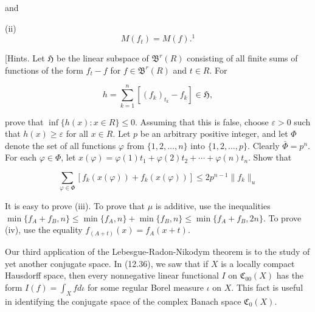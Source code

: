 and

(ii) $$M(f_t) = M(f).^1$$

[Hints. Let $\mathfrak{H}$ be the linear subspace of $\mathfrak{B}^r(R)$ consisting of all finite sums of functions of the form $f_t - f$ for $f \in \mathfrak{B}^r(R)$ and $t \in R$. For

$$h = \sum_{k=1}^{n} \left[ (f_k)_{t_k} - f_k \right] \in \mathfrak{H},$$

prove that $\inf\{h(x): x \in R\} \leq 0$. Assuming that this is false, choose $\varepsilon > 0$ such that $h(x) \geq \varepsilon$ for all $x \in R$. Let $p$ be an arbitrary positive integer, and let $\Phi$ denote the set of all functions $\varphi$ from $\{1, 2, \ldots, n\}$ into $\{1, 2, \ldots, p\}$. Clearly $\bar{\Phi} = p^n$. For each $\varphi \in \Phi$, let $x(\varphi) = \varphi(1)t_1 + \varphi(2)t_2 + \cdots + \varphi(n)t_n$. Show that

$$\sum_{\varphi \in \Phi} \left[ f_k(x(\varphi)) + f_k(x(\varphi)) \right] \leq 2p^{n-1} \|f_k\|_u$$

It is easy to prove (iii). To prove that $\mu$ is additive, use the inequalities $\min\{f_A + f_B, n\} \leq \min\{f_A, n\} + \min\{f_B, n\} \leq \min\{f_A + f_B, 2n\}$. To prove (iv), use the equality $f_{(A+t)}(x) = f_A(x + t)$.

Our third application of the Lebesgue-Radon-Nikodym theorem is to the study of yet another conjugate space. In (12.36), we saw that if $X$ is a locally compact Hausdorff space, then every nonnegative linear functional $I$ on $\mathfrak{C}_{00}(X)$ has the form $I(f) = \int_X f d\iota$ for some regular Borel measure $\iota$ on $X$. This fact is useful in identifying the conjugate space of the complex Banach space $\mathfrak{C}_0(X)$.